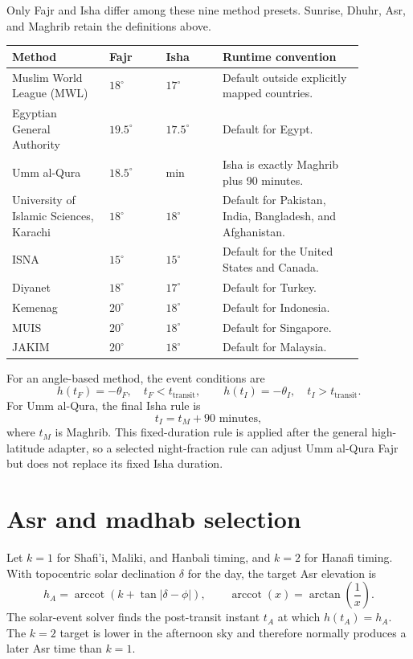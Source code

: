\documentclass[11pt,a4paper]{article}
\begin{document}
Only Fajr and Isha differ among these nine method presets. Sunrise, Dhuhr, Asr, and Maghrib retain the definitions above.

\begin{longtable}{>{\raggedright\arraybackslash}p{0.24\linewidth} >{\centering\arraybackslash}p{0.14\linewidth} >{\centering\arraybackslash}p{0.14\linewidth} p{0.35\linewidth}}
\toprule
\textbf{Method} & \textbf{Fajr} & \textbf{Isha} & \textbf{Runtime convention} \\
\midrule
\endhead
Muslim World League (MWL) & $18^\circ$ & $17^\circ$ & Default outside explicitly mapped countries. \\
Egyptian General Authority & $19.5^\circ$ & $17.5^\circ$ & Default for Egypt. \\
Umm al-Qura & $18.5^\circ$ & 90 min & Isha is exactly Maghrib plus 90 minutes. \\
University of Islamic Sciences, Karachi & $18^\circ$ & $18^\circ$ & Default for Pakistan, India, Bangladesh, and Afghanistan. \\
ISNA & $15^\circ$ & $15^\circ$ & Default for the United States and Canada. \\
Diyanet & $18^\circ$ & $17^\circ$ & Default for Turkey. \\
Kemenag & $20^\circ$ & $18^\circ$ & Default for Indonesia. \\
MUIS & $20^\circ$ & $18^\circ$ & Default for Singapore. \\
JAKIM & $20^\circ$ & $18^\circ$ & Default for Malaysia. \\
\bottomrule
\end{longtable}

For an angle-based method, the event conditions are
\[
 h(t_F)=-\theta_F,\quad t_F<t_{\mathrm{transit}},
 \qquad
 h(t_I)=-\theta_I,\quad t_I>t_{\mathrm{transit}}.
\]
For Umm al-Qura, the final Isha rule is
\begin{equation}
  t_I=t_M+90\text{ minutes},
\end{equation}
where $t_M$ is Maghrib. This fixed-duration rule is applied after the general high-latitude adapter, so a selected night-fraction rule can adjust Umm al-Qura Fajr but does not replace its fixed Isha duration.

\section{Asr and madhab selection}\label{sec:asr}

Let $k=1$ for Shafi'i, Maliki, and Hanbali timing, and $k=2$ for Hanafi timing. With topocentric solar declination $\delta$ for the day, the target Asr elevation is
\begin{equation}
  h_A=\operatorname{arccot}\!\left(k+\tan|\delta-\phi|\right),
  \qquad \operatorname{arccot}(x)=\arctan\!\left(\frac{1}{x}\right).
\end{equation}
The solar-event solver finds the post-transit instant $t_A$ at which $h(t_A)=h_A$. The $k=2$ target is lower in the afternoon sky and therefore normally produces a later Asr time than $k=1$.
\end{document}
